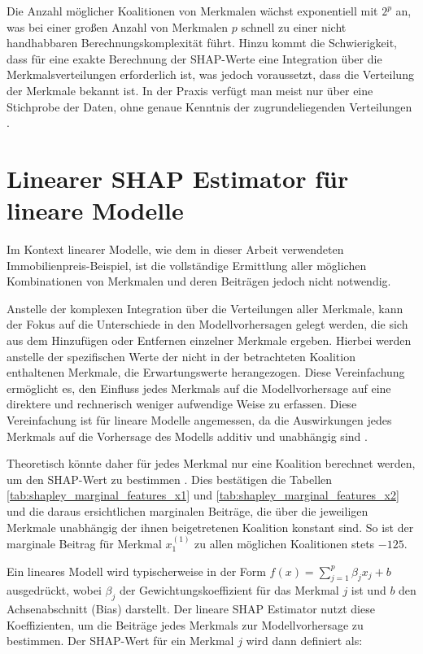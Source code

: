 Die Anzahl möglicher Koalitionen von Merkmalen wächst exponentiell mit \( 2^p \) an, 
was bei einer großen Anzahl von Merkmalen \( p \) schnell zu einer nicht handhabbaren Berechnungskomplexität führt. 
Hinzu kommt die Schwierigkeit, dass für eine exakte Berechnung der SHAP-Werte eine Integration 
über die Merkmalsverteilungen erforderlich ist, was jedoch voraussetzt, dass die Verteilung der Merkmale bekannt ist. 
In der Praxis verfügt man meist nur über eine Stichprobe der Daten, ohne genaue Kenntnis der zugrundeliegenden Verteilungen \cite[S. 33]{Molnar_2023}.

\section{Linearer SHAP Estimator für lineare Modelle}
\label{subsec:linear-shap-estimator}

Im Kontext linearer Modelle, 
wie dem in dieser Arbeit verwendeten Immobilienpreis-Beispiel, 
ist die vollständige Ermittlung aller möglichen Kombinationen von Merkmalen und deren 
Beiträgen jedoch nicht notwendig. 

Anstelle der komplexen Integration 
über die Verteilungen aller Merkmale, kann der Fokus auf die Unterschiede in den Modellvorhersagen gelegt werden, 
die sich aus dem Hinzufügen oder Entfernen einzelner Merkmale ergeben. 
Hierbei werden anstelle der spezifischen Werte der nicht in der betrachteten Koalition enthaltenen Merkmale, 
die Erwartungswerte herangezogen. Diese Vereinfachung ermöglicht es, den Einfluss jedes Merkmals auf 
die Modellvorhersage auf eine direktere und rechnerisch weniger aufwendige Weise zu erfassen.
Diese Vereinfachung ist für lineare Modelle angemessen, da die Auswirkungen jedes Merkmals 
auf die Vorhersage des Modells additiv und unabhängig sind \cite[S. 48]{Molnar_2023}.

Theoretisch könnte daher für jedes Merkmal nur eine Koalition berechnet werden, 
um den SHAP-Wert zu bestimmen \cite[S. 38]{Molnar_2023}. Dies bestätigen die
Tabellen \ref{tab:shapley_marginal_features_x1} und \ref{tab:shapley_marginal_features_x2}
und die daraus ersichtlichen marginalen Beiträge, die über die jeweiligen Merkmale
unabhängig der ihnen beigetretenen Koalition konstant sind. So ist der marginale Beitrag für Merkmal $x_1^{(1)}$
zu allen möglichen Koalitionen stets $-125$.

Ein lineares Modell wird typischerweise in der Form 
\( f(x) = \sum_{j=1}^{p} \beta_j x_j + b \) ausgedrückt, wobei \( \beta_j \) der 
Gewichtungskoeffizient für das Merkmal \( j \) ist und \( b \) den 
Achsenabschnitt (Bias) darstellt. Der lineare SHAP Estimator nutzt 
diese Koeffizienten, um die Beiträge jedes Merkmals zur Modellvorhersage 
zu bestimmen. Der SHAP-Wert für ein Merkmal \( j \) wird dann definiert als:

